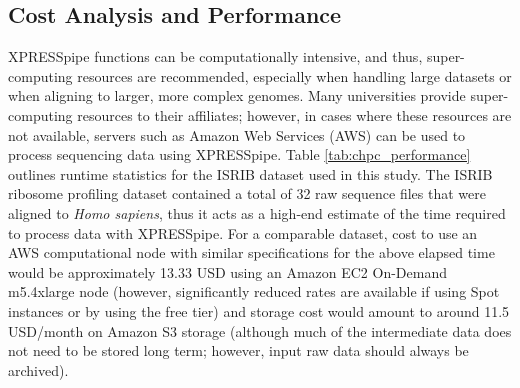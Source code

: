 \documentclass[10pt, oneside]{article}
\begin{document}
\subsection*{Cost Analysis and Performance}
XPRESSpipe functions can be computationally intensive, and thus, super-computing resources are recommended, especially when handling large datasets or when aligning to larger, more complex genomes. Many universities provide super-computing resources to their affiliates; however, in cases where these resources are not available, servers such as Amazon Web Services (AWS) \cite{aws} can be used to process sequencing data using XPRESSpipe. Table \ref{tab:chpc_performance} outlines runtime statistics for the ISRIB dataset used in this study. The ISRIB ribosome profiling dataset contained a total of 32 raw sequence files that were aligned to \textit{Homo sapiens}, thus it acts as a high-end estimate of the time required to process data with XPRESSpipe. For a comparable dataset, cost to use an AWS computational node with similar specifications for the above elapsed time would be approximately 13.33 USD using an Amazon EC2 On-Demand m5.4xlarge node (however, significantly reduced rates are available if using Spot instances or by using the free tier) and storage cost would amount to around 11.5 USD/month on Amazon S3 storage (although much of the intermediate data does not need to be stored long term; however, input raw data should always be archived). \\
\end{document}
